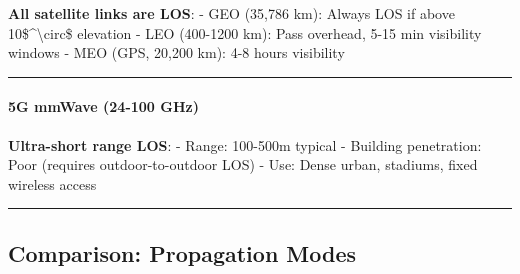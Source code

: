 \textbf{All satellite links are LOS}: - GEO (35,786 km): Always LOS if
above 10\$\^{}\textbackslash circ\$ elevation - LEO (400-1200 km): Pass
overhead, 5-15 min visibility windows - MEO (GPS, 20,200 km): 4-8 hours
visibility

\begin{center}\rule{0.5\linewidth}{0.5pt}\end{center}

\paragraph{5G mmWave (24-100 GHz)}\label{g-mmwave-24-100-ghz}

\textbf{Ultra-short range LOS}: - Range: 100-500m typical - Building
penetration: Poor (requires outdoor-to-outdoor LOS) - Use: Dense urban,
stadiums, fixed wireless access

\begin{center}\rule{0.5\linewidth}{0.5pt}\end{center}

\subsection{Comparison: Propagation
Modes}\label{comparison-propagation-modes}

